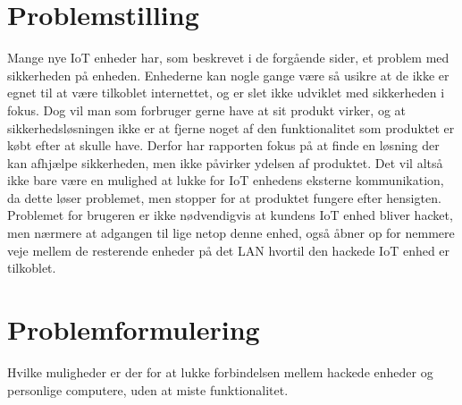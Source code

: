 \section{Problemstilling}


Mange nye IoT enheder har, som beskrevet i de forgående sider, et problem med sikkerheden på enheden. Enhederne kan nogle gange være så usikre at de ikke er egnet til at være tilkoblet internettet, og er slet ikke udviklet med sikkerheden i fokus. Dog vil man som forbruger gerne have at sit produkt virker, og at sikkerhedsløsningen ikke er at fjerne noget af den funktionalitet som produktet er købt efter at skulle have. Derfor har rapporten fokus på at finde en løsning der kan afhjælpe sikkerheden, men ikke påvirker ydelsen af produktet. Det vil altså ikke bare være en mulighed at lukke for IoT enhedens eksterne kommunikation, da dette løser problemet, men stopper for at produktet fungere efter hensigten.\\
Problemet for brugeren er ikke nødvendigvis at kundens IoT enhed bliver hacket, men nærmere at adgangen til lige netop denne enhed, også åbner op for nemmere veje mellem de resterende enheder på det LAN hvortil den hackede IoT enhed er tilkoblet.




\section{Problemformulering}
Hvilke muligheder er der for at lukke forbindelsen mellem hackede enheder og personlige computere, uden at miste funktionalitet.
\\
\\

